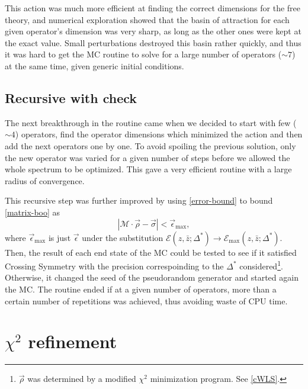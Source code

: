 \documentclass[letterpaper]{article}
\numberwithin{equation}{section}
\begin{document}
This action was much more efficient at finding the correct dimensions for the
free theory, and numerical exploration showed that the basin of attraction for
each given operator's dimension was very sharp, as long as the other ones were
kept at the exact value. Small perturbations destroyed this basin rather
quickly, and thus it was hard to get the MC routine to solve for a large number
of operators  ($\sim 7$) at the same time, given generic initial conditions.

\subsection{Recursive with check}
\label{rec-check}

The next breakthrough in the routine came when we decided to start with few
($\sim 4$) operators, find the operator dimensions which minimized the 
action and then add the next operators one by one. To avoid spoiling
the previous solution, only the new operator was varied for a given number of
steps before we allowed the whole spectrum to be optimized. This gave a very
efficient routine with a large radius of convergence.

This recursive step was further improved by using
\ref{error-bound} to bound \ref{matrix-boo} as 
\begin{equation}
  | \mathcal{M}\cdot \vec{\rho}-\vec{\sigma} | < \vec{\epsilon}_{\mathrm{max}},
  \label{cross-check}
\end{equation}
where $\vec \epsilon _{\mathrm{max}}$ is just $\vec \epsilon$ under the
substitution $\mathcal{E}(z,\bar z;
\Delta^*)\to\mathcal{E}_{\mathrm{max}}(z,\bar z; \Delta^*)$.
Then, the result of each end state of the MC could be tested to see if it
satisfied Crossing Symmetry with the precision correspoinding to the $\Delta^*$
considered\footnote{$\vec \rho$ was determined by a modified $\chi^2$
minimization program. See \ref{cWLS}.}. Otherwise, it changed the seed of the pseudorandom generator and
started again the MC. The routine ended if at a given number of operators, more
than a certain number of repetitions was achieved, thus avoiding waste of CPU
time.


\section{$\chi^2$ refinement}
\end{document}
